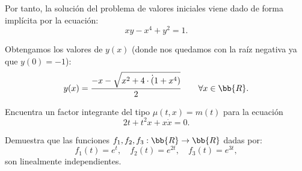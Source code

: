 \documentclass[12pt]{article}
\begin{document}
\begin{ejercicio}
    Por tanto, la solución del problema de valores iniciales viene dado de forma implícita por la ecuación:
    \begin{equation*}
        xy - x^4 + y^2 = 1.
    \end{equation*}

    Obtengamos los valores de $y(x)$ (donde nos quedamos con la raíz negativa ya que $y(0)=-1$):
    \begin{equation*}
        y(x)=\dfrac{-x- \sqrt{x^2+4\cdot \dot (1+x^4)}}{2}
        \qquad \forall x\in \bb{R}.
    \end{equation*}
\end{ejercicio}

\begin{ejercicio}
    Encuentra un factor integrante del tipo $\mu(t,x) = m(t)$ para la ecuación
    \begin{equation*}
        2t + t^2x + x\dot{x} = 0.
    \end{equation*}
\end{ejercicio}

\begin{ejercicio}
    Demuestra que las funciones $f_1,f_2,f_3:\bb{R}\to \bb{R}$ dadas por:
    \begin{equation*}
        f_1(t) = e^t, \quad f_2(t) = e^{2t}, \quad f_3(t) = e^{3t},
    \end{equation*}
    son linealmente independientes.
\end{ejercicio}
\end{document}
